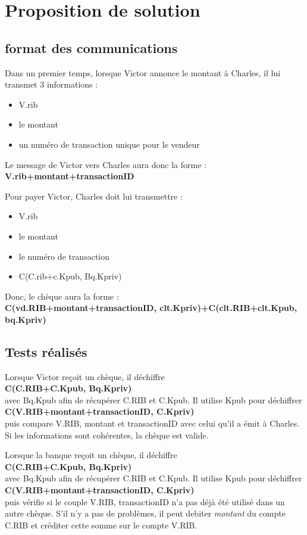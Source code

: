 \documentclass[oneside,10pt]{article}
\begin{document}
\section{Proposition de solution}
\subsection{format des communications}
Dans un premier temps, lorsque Victor annonce le montant \`a Charles, il lui transmet 3 informations :
\begin{itemize}
\item V.rib
\item le montant
\item un num\'ero de transaction unique pour le vendeur
\end{itemize}
Le message de Victor vers Charles aura donc la forme :\\\textbf{V.rib+montant+transactionID}


Pour payer Victor, Charles doit lui transmettre :
\begin{itemize}
\item V.rib
\item le montant
\item le num\'ero de transaction
\item C(C.rib+c.Kpub, Bq.Kpriv)
\end{itemize}
Donc, le ch\`eque aura la forme : \\\textbf{C(vd.RIB+montant+transactionID, clt.Kpriv)+C(clt.RIB+clt.Kpub, bq.Kpriv)}
\subsection{Tests r\'ealis\'es}
Lorsque Victor re\c coit un ch\`eque, il d\'echiffre \\\textbf{C(C.RIB+C.Kpub, Bq.Kpriv)}\\avec Bq.Kpub afin de r\'ecup\'erer C.RIB et C.Kpub.
Il utilise Kpub pour d\'echiffrer \\\textbf{C(V.RIB+montant+transactionID, C.Kpriv)}\\puis compare V.RIB, montant et transactionID avec celui qu'il a \'emit \`a Charles.
Si les informations sont coh\'erentes, la ch\`eque est valide.


Lorsque la banque re\c coit un ch\`eque, il d\'echiffre \\\textbf{C(C.RIB+C.Kpub, Bq.Kpriv)}\\avec Bq.Kpub afin de r\'ecup\'erer C.RIB et C.Kpub.
Il utilise Kpub pour d\'echiffrer \\\textbf{C(V.RIB+montant+transactionID, C.Kpriv)}\\puis v\'erifie si le couple V.RIB, transactionID n'a pas d\'ej\`a \'et\'e utilis\'e dans un autre ch\`eque.
S'il n'y a pas de probl\`emes, il peut debiter \textit{montant} du compte C.RIB et cr\'editer cette somme sur le compte V.RIB.
\end{document}
